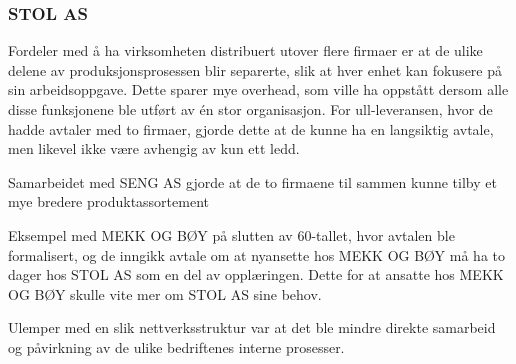\subsubsection{STOL AS}

Fordeler med å ha virksomheten distribuert utover flere firmaer er at de ulike delene av produksjonsprosessen blir separerte, slik at hver enhet kan fokusere på sin arbeidsoppgave.
Dette sparer mye overhead, som ville ha oppstått dersom alle disse funksjonene ble utført av én stor organisasjon.
For ull-leveransen, hvor de hadde avtaler med to firmaer, gjorde dette at de kunne ha en langsiktig avtale, men likevel ikke være avhengig av kun ett ledd.

Samarbeidet med SENG AS gjorde at de to firmaene til sammen kunne tilby et mye bredere produktassortement

Eksempel med MEKK OG BØY på slutten av 60-tallet, hvor avtalen ble formalisert, og de inngikk avtale om at nyansette hos MEKK OG BØY må ha to dager hos STOL AS som en del av opplæringen.
Dette for at ansatte hos MEKK OG BØY skulle vite mer om STOL AS sine behov.

Ulemper med en slik nettverksstruktur var at det ble mindre direkte samarbeid og påvirkning av de ulike bedriftenes interne prosesser.
